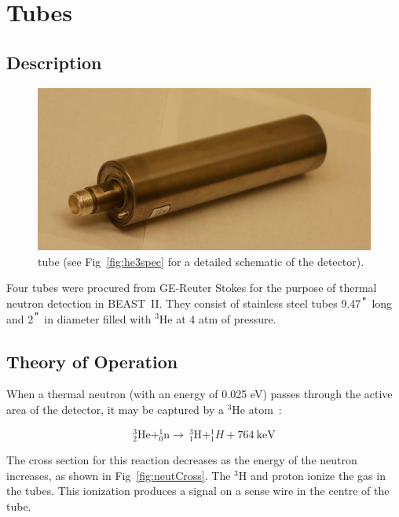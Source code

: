 \chapter{\He Tubes}
\label{chap:he3tube}

\section{Description}


\begin{figure}[htb]
	\centerfloat
		\includegraphics[scale=0.25]{images/he3tubePhoto}
	\caption[\He tube]{\He tube (see Fig~\ref{fig:he3spec} for a detailed schematic of the detector).}
	\label{fig:he3photo}
\end{figure}

	Four \he tubes were procured from GE-Reuter Stokes for the purpose of thermal neutron detection in BEAST~II. They consist of stainless steel tubes 9.47$^{\verb+"+}$ long and 2$^{\verb+"+}$ in diameter filled with $^3$He at 4 atm of pressure. 


\section{Theory of Operation}

When a thermal neutron (with an energy of 0.025 eV) passes through the active area of the detector, it may be captured by a $^3$He atom~\cite{Oed200462}:

\begin{equation}
		{^{3}_{2}\mathrm{He}+^{1}_{0}\mathrm{n}\rightarrow~^{3}_{1}\mathrm{H}+^{1}_{1}H+764~\mathrm{keV}}
\end{equation}

The cross section for this reaction decreases as the energy of the neutron increases, as shown in Fig~\ref{fig:neutCross}. The $^3$H and proton ionize the gas in the tubes. This ionization produces a signal on a sense wire in the centre of the tube.

